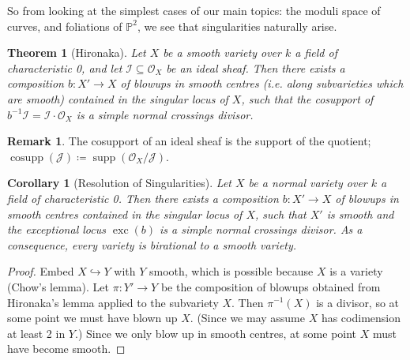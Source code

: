 \documentclass{article}
\newtheorem*{theorem}{Theorem}
\newtheorem*{corollary}{Corollary}
\theoremstyle{definition}
\newtheorem*{remark}{Remark}
\DeclareMathOperator{\exc}{exc}
\DeclareMathOperator{\supp}{supp}
\DeclareMathOperator{\cosupp}{cosupp}
\newcommand{\I}{\mathscr{I}}
\newcommand{\J}{\mathscr{J}}
\renewcommand{\O}{\mathcal{O}}
\renewcommand{\P}{\mathbb{P}}
\begin{document}
So from looking at the simplest cases of our main topics: the moduli space of
curves, and foliations of $\P^2$, we see that singularities naturally arise.

\begin{theorem}[Hironaka]
    Let $X$ be a smooth variety over $k$ a field of characteristic 0, and let
    $\I\subseteq\O_X$ be an ideal sheaf. Then there exists a composition
    $b:X'\to X$ of blowups in smooth centres (i.e. along subvarieties which are
    smooth) contained in the singular locus of $X$, such that the cosupport of
    $b^{-1}\I=\I\cdot\O_X$ is a simple normal crossings divisor.
\end{theorem}

\begin{remark}
    The cosupport of an ideal sheaf is the support of the quotient;
    $\cosupp(\J)\coloneq\supp(\O_X/\J)$.
\end{remark}

\begin{corollary}[Resolution of Singularities]
    Let $X$ be a normal variety over $k$ a field of characteristic 0. Then there
    exists a composition $b:X'\to X$ of blowups in smooth centres contained in
    the singular locus of $X$, such that $X'$ is smooth and the exceptional
    locus $\exc(b)$ is a simple normal crossings divisor. As a consequence,
    every variety is birational to a smooth variety.
\end{corollary}

\begin{proof}
    Embed $X\hookrightarrow Y$ with $Y$ smooth, which is possible because $X$ is
    a variety (Chow's lemma). Let $\pi:Y'\to Y$ be the composition of blowups
    obtained from Hironaka's lemma applied to the subvariety $X$. Then
    $\pi^{-1}(X)$ is a divisor, so at some point we must have blown up $X$.
    (Since we may assume $X$ has codimension at least 2 in $Y$.) Since we only
    blow up in smooth centres, at some point $X$ must have become smooth.
\end{proof}
\end{document}
